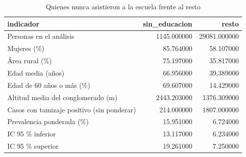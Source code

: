 \begin{table}[htbp]
\caption{Quienes nunca asistieron a la escuela frente al resto}
\label{tab:tabla_63_perfil_sin_educacion}
\begin{tabular}{lrr}
\toprule
indicador & sin\_educacion & resto \\
\midrule
Personas en el análisis & 1145.000000 & 29081.000000 \\
Mujeres (\%) & 85.764000 & 58.107000 \\
Área rural (\%) & 75.197000 & 35.817000 \\
Edad media (años) & 66.956000 & 39.389000 \\
Edad de 60 años o más (\%) & 69.607000 & 14.429000 \\
Altitud media del conglomerado (m) & 2443.203000 & 1376.309000 \\
Casos con tamizaje positivo (sin ponderar) & 214.000000 & 1807.000000 \\
Prevalencia ponderada (\%) & 15.951000 & 6.724000 \\
IC 95 \% inferior & 13.117000 & 6.234000 \\
IC 95 \% superior & 19.261000 & 7.250000 \\
\bottomrule
\end{tabular}
\end{table}
